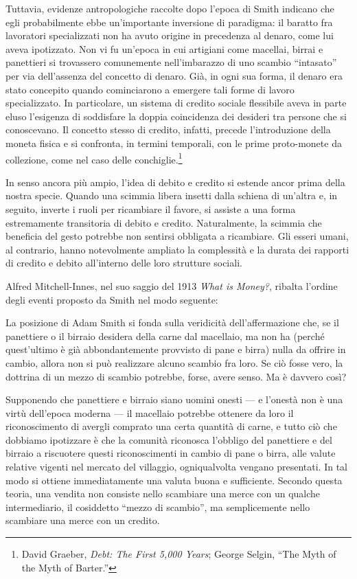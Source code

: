 \documentclass[
  a5paper,
  smalldemyvopaper,10pt,twoside,onecolumn,openright,extrafontsizes,hidelinks]{memoir}
\renewenvironment{quote}%
               {\list{}{\rightmargin=.6cm\leftmargin=.6cm}%
                \itshape \item[]}%
               {\endlist}
\begin{document}
Tuttavia, evidenze antropologiche raccolte dopo l'epoca di Smith
indicano che egli probabilmente ebbe un'importante inversione di
paradigma: il baratto fra lavoratori specializzati non ha avuto origine
in precedenza al denaro, come lui aveva ipotizzato. Non vi fu un'epoca
in cui artigiani come macellai, birrai e panettieri si trovassero
comunemente nell'imbarazzo di uno scambio ``intasato'' per via
dell'assenza del concetto di denaro. Già, in ogni sua forma, il denaro
era stato concepito quando cominciarono a emergere tali forme di lavoro
specializzato. In particolare, un sistema di credito sociale flessibile
aveva in parte eluso l'esigenza di soddisfare la doppia coincidenza dei
desideri tra persone che si conoscevano. Il concetto stesso di credito,
infatti, precede l'introduzione della moneta fisica e si confronta, in
termini temporali, con le prime proto-monete da collezione, come nel
caso delle conchiglie.\footnote{David Graeber, \emph{Debt: The First
  5,000 Years}; George Selgin, ``The Myth of the Myth of Barter.''}

In senso ancora più ampio, l'idea di debito e credito si estende ancor
prima della nostra specie. Quando una scimmia libera insetti dalla
schiena di un'altra e, in seguito, inverte i ruoli per ricambiare il
favore, si assiste a una forma estremamente transitoria di debito e
credito. Naturalmente, la scimmia che beneficia del gesto potrebbe non
sentirsi obbligata a ricambiare. Gli esseri umani, al contrario, hanno
notevolmente ampliato la complessità e la durata dei rapporti di credito
e debito all'interno delle loro strutture sociali.

Alfred Mitchell-Innes, nel suo saggio del 1913 \emph{What is Money?},
ribalta l'ordine degli eventi proposto da Smith nel modo seguente:

\begin{quote}
La posizione di Adam Smith si fonda sulla veridicità dell'affermazione
che, se il panettiere o il birraio desidera della carne dal macellaio,
ma non ha (perché quest'ultimo è già abbondantemente provvisto di pane e
birra) nulla da offrire in cambio, allora non si può realizzare alcuno
scambio fra loro. Se ciò fosse vero, la dottrina di un mezzo di scambio
potrebbe, forse, avere senso. Ma è davvero così?
\end{quote}

\begin{quote}
Supponendo che panettiere e birraio siano uomini onesti --- e l'onestà
non è una virtù dell'epoca moderna --- il macellaio potrebbe ottenere da
loro il riconoscimento di avergli comprato una certa quantità di carne,
e tutto ciò che dobbiamo ipotizzare è che la comunità riconosca
l'obbligo del panettiere e del birraio a riscuotere questi
riconoscimenti in cambio di pane o birra, alle valute relative vigenti
nel mercato del villaggio, ogniqualvolta vengano presentati. In tal modo
si ottiene immediatamente una valuta buona e sufficiente. Secondo questa
teoria, una vendita non consiste nello scambiare una merce con un
qualche intermediario, il cosiddetto ``mezzo di scambio'', ma
semplicemente nello scambiare una merce con un credito.
\end{quote}
\end{document}
